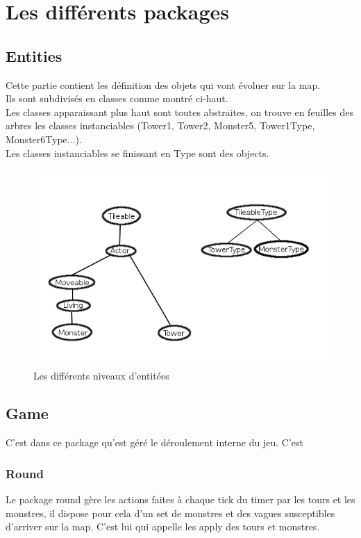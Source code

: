 \documentclass{article}
\begin{document}
\section{Les différents packages}

\subsection{Entities}
Cette partie contient les définition des objets qui vont évoluer sur la map.\\
Ils sont subdivisés en classes comme montré ci-haut.\\
Les classes apparaissant plus haut sont toutes abstraites, on trouve en feuilles des arbres les classes instanciables (Tower1, Tower2, Monster5, Tower1Type, Monster6Type...).\\
Les classes instanciables se finissant en Type sont des objects.


\begin{figure}[h]
\center
\includegraphics[scale = 0.4]{Entities.png}
\caption{Les différents niveaux d'entitées}
\end{figure}

\subsection{Game}
C'est dans ce package qu'est géré le déroulement interne du jeu. C'est 
\subsubsection{Round}
Le package round gère les actions faites à chaque tick du timer par les tours et les monstres, il dispose pour cela d'un set de monstres et des vagues susceptibles d'arriver sur la map. C'est lui qui appelle les apply des tours et monstres.
\end{document}
